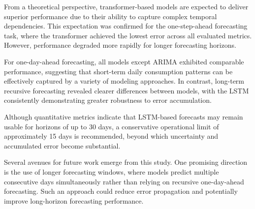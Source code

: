 \par
From a theoretical perspective, transformer-based models are expected to deliver superior performance due to their ability to capture complex temporal dependencies. This expectation was confirmed for the one-step-ahead forecasting task, where the transformer achieved the lowest error across all evaluated metrics. However, performance degraded more rapidly for longer forecasting horizons.

\par
For one-day-ahead forecasting, all models except ARIMA exhibited comparable performance, suggesting that short-term daily consumption patterns can be effectively captured by a variety of modeling approaches. In contrast, long-term recursive forecasting revealed clearer differences between models, with the LSTM consistently demonstrating greater robustness to error accumulation.

\par
Although quantitative metrics indicate that LSTM-based forecasts may remain usable for horizons of up to 30 days, a conservative operational limit of approximately 15 days is recommended, beyond which uncertainty and accumulated error become substantial.




\par
Several avenues for future work emerge from this study. One promising direction is the use of longer forecasting windows, where models predict multiple consecutive days simultaneously rather than relying on recursive one-day-ahead forecasting. Such an approach could reduce error propagation and potentially improve long-horizon forecasting performance.

